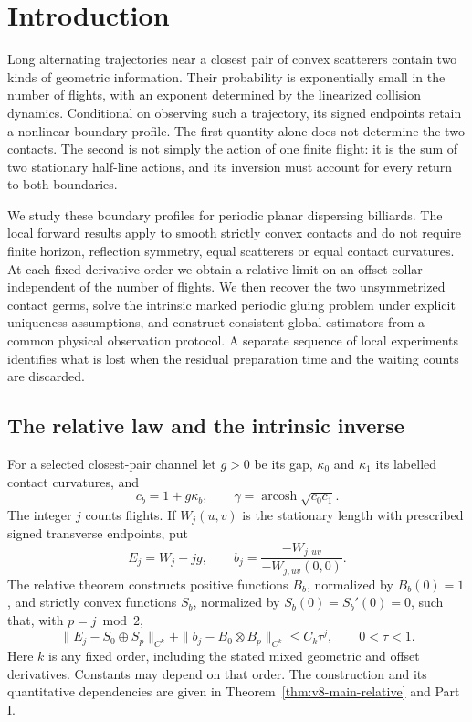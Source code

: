 \section{Introduction}
\label{sec:v25-introduction}

Long alternating trajectories near a closest pair of convex scatterers
contain two kinds of geometric information.  Their probability is
exponentially small in the number of flights, with an exponent determined
by the linearized collision dynamics.  Conditional on observing such a
trajectory, its signed endpoints retain a nonlinear boundary profile.  The
first quantity alone does not determine the two contacts.  The second is
not simply the action of one finite flight: it is the sum of two stationary
half-line actions, and its inversion must account for every return to both
boundaries.

We study these boundary profiles for periodic planar dispersing billiards.
The local forward results apply to smooth strictly convex contacts and do
not require finite horizon, reflection symmetry, equal scatterers or equal
contact curvatures.  At each fixed derivative order we obtain a relative
limit on an offset collar independent of the number of flights.  We then
recover the two unsymmetrized contact germs, solve the intrinsic marked
periodic gluing problem under explicit uniqueness assumptions, and construct
consistent global estimators from a common physical observation protocol.
A separate sequence of local experiments identifies what is lost when the
residual preparation time and the waiting counts are discarded.

\subsection{The relative law and the intrinsic inverse}

For a selected closest-pair channel let \(g>0\) be its gap, \(\kappa_0\)
and \(\kappa_1\) its labelled contact curvatures, and
\[
 c_b=1+g\kappa_b,\qquad
 \gamma=\operatorname{arcosh}\sqrt{c_0c_1}.
\]
The integer \(j\) counts flights.  If \(W_j(u,v)\) is the stationary
length with prescribed signed transverse endpoints, put
\[
 E_j=W_j-jg,\qquad b_j=\frac{-W_{j,uv}}{-W_{j,uv}(0,0)}.
\]
The relative theorem constructs positive functions \(B_b\), normalized
by \(B_b(0)=1\), and strictly convex functions \(S_b\), normalized by
\(S_b(0)=S_b'(0)=0\), such that, with \(p=j\bmod2\),
\begin{equation}\label{eq:v25-intro-relative}
 \|E_j-S_0\oplus S_p\|_{C^k}
       +\|b_j-B_0\otimes B_p\|_{C^k}\le C_k\tau^j,
       \qquad 0<\tau<1.
\end{equation}
Here \(k\) is any fixed order, including the stated mixed geometric and
offset derivatives.  Constants may depend on that order.  The construction
and its quantitative dependencies are given in
Theorem~\ref{thm:v8-main-relative} and Part I.

